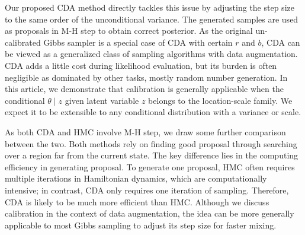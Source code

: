 \documentclass[10pt]{article}
\begin{document}
Our proposed CDA method directly tackles this issue by adjusting the step size to the same order of the unconditional variance. The generated samples are used as proposals in M-H step to obtain correct posterior. As the original un-calibrated Gibbs sampler is a special case of CDA with certain $r$ and $b$, CDA can be viewed as a generalized class of sampling algorithms with data augmentation. CDA adds a little cost during likelihood evaluation, but its burden is often negligible as dominated by other tasks, mostly random number generation. In this article, we demonstrate that calibration is generally applicable when the conditional $\theta \mid z$ given latent variable $z$ belongs to the location-scale family. We expect it to be extensible to any conditional distribution with a variance or scale.

As both CDA and HMC involve M-H step, we draw some further comparison between the two. Both methods rely on finding good proposal through searching over a region far from the current state. The key difference lies in the computing efficiency in generating proposal. To generate one proposal, HMC often requires multiple iterations in Hamiltonian dynamics, which are computationally intensive; in contrast, CDA only requires one iteration of sampling. Therefore, CDA is likely to be much more efficient than HMC. Although we discuss calibration in the context of data augmentation, the idea can be more generally applicable to most Gibbs sampling to adjust its step size for faster mixing. 




%
%
%
%
\end{document}
